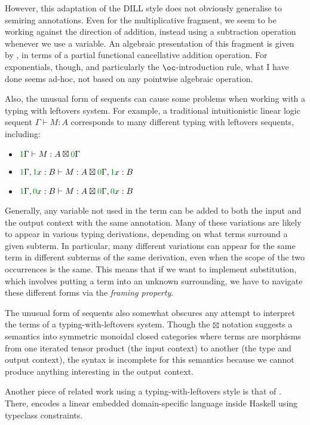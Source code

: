 However, this adaptation of the DILL style does not obviously generalise to
semiring annotations.
Even for the multiplicative fragment, we seem to be working against the
direction of addition, instead using a subtraction operation whenever we use a
variable.
An algebraic presentation of this fragment is given by \citet{ZD21}, in terms of
a partial functional cancellative addition operation.
For exponentials, though, and particularly the $\oc$-introduction rule, what I
have done seems ad-hoc, not based on any pointwise algebraic operation.

Also, the unusual form of sequents can cause some problems when working with a
typing with leftovers system.
For example, a traditional intuitionistic linear logic sequent
$\Gamma \vdash M : A$ corresponds to many different typing with leftovers
sequents, including:
\begin{itemize}
  \item $\gr1\Gamma \vdash M : A \boxtimes \gr0\Gamma$
  \item $\gr1\Gamma, \gr1x : B \vdash M : A \boxtimes \gr0\Gamma, \gr1x : B$
  \item $\gr1\Gamma, \gr0x : B \vdash M : A \boxtimes \gr0\Gamma, \gr0x : B$
\end{itemize}

Generally, any variable not used in the term can be added to both the input and
the output context with the same annotation.
Many of these variations are likely to appear in various typing derivations,
depending on what terms surround a given subterm.
In particular, many different variations can appear for the same term in
different subterms of the same derivation, even when the scope of the two
occurrences is the same.
This means that if we want to implement substitution, which involves putting a
term into an unknown surrounding, we have to navigate these different forms via
the \emph{framing property}.

The unusual form of sequents also somewhat obscures any attempt to interpret the
terms of a typing-with-leftovers system.
Though the $\boxtimes$ notation suggests a semantics into symmetric monoidal
closed categories where terms are morphisms from one iterated tensor product
(the input context) to another (the type and output context), the syntax is
incomplete for this semantics because we cannot produce anything interesting in
the output context.

Another piece of related work using a typing-with-leftovers style is that of
\citet{polakow15}.
There, \citeauthor{polakow15} encodes a linear embedded domain-specific language
inside Haskell using typeclass constraints.

